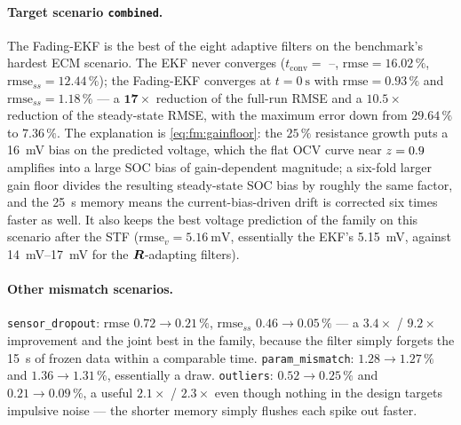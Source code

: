 \paragraph{Target scenario \texttt{combined}.}  The Fading-EKF is the best of the eight adaptive
filters on the benchmark's hardest ECM scenario.  The EKF never converges ($t_\mathrm{conv}=$ --,
$\mathrm{rmse}=16.02\,\%$, $\mathrm{rmse}_{ss}=12.44\,\%$); the Fading-EKF converges at
$t=\SI{0}{\second}$ with $\mathrm{rmse}=\mathbf{0.93\,\%}$ and
$\mathrm{rmse}_{ss}=\mathbf{1.18\,\%}$ --- a $\mathbf{17\times}$ reduction of the full-run RMSE and a
$\mathbf{10.5\times}$ reduction of the steady-state RMSE, with the maximum error down from $29.64\,\%$
to $7.36\,\%$.  The explanation is \eqref{eq:fm:gainfloor}: the $25\,\%$ resistance growth puts a
\SI{16}{\milli\volt} bias on the predicted voltage, which the flat OCV curve near $z=0.9$ amplifies
into a large SOC bias of gain-dependent magnitude; a six-fold larger gain floor divides the resulting
steady-state SOC bias by roughly the same factor, and the \SI{25}{\second} memory means the
current-bias-driven drift is corrected six times faster as well.  It also keeps the best voltage
prediction of the family on this scenario after the STF ($\mathrm{rmse}_v=\SI{5.16}{\milli\volt}$,
essentially the EKF's \SI{5.15}{\milli\volt}, against \SI{14}{\milli\volt}--\SI{17}{\milli\volt} for
the $\bm{R}$-adapting filters).

\paragraph{Other mismatch scenarios.}  \texttt{sensor\_dropout}: $\mathrm{rmse}$ $0.72\to0.21\,\%$,
$\mathrm{rmse}_{ss}$ $0.46\to0.05\,\%$ --- a $3.4\times$ / $9.2\times$ improvement and the joint best
in the family, because the filter simply forgets the \SI{15}{\second} of frozen data within a
comparable time.  \texttt{param\_mismatch}: $1.28\to1.27\,\%$ and $1.36\to1.31\,\%$, essentially a
draw.  \texttt{outliers}: $0.52\to0.25\,\%$ and $0.21\to0.09\,\%$, a useful $2.1\times$ / $2.3\times$
even though nothing in the design targets impulsive noise --- the shorter memory simply flushes each
spike out faster.

